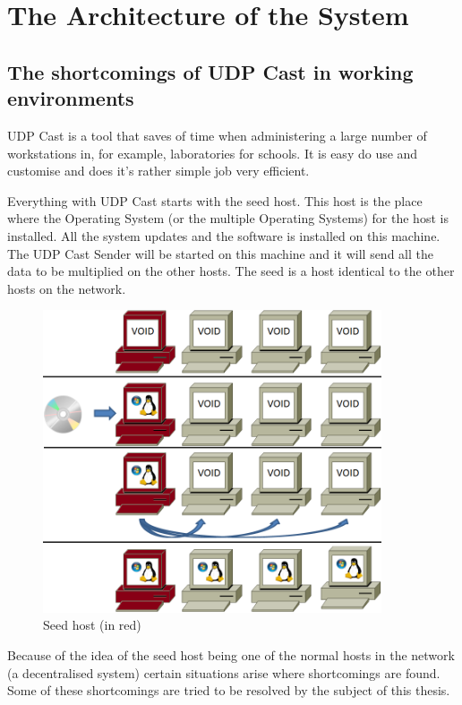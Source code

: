 

\chapter{The Architecture of the System}\label{ch:arch}
\bigskip


\section{The shortcomings of UDP Cast in working environments}

UDP Cast is a tool that saves of time when administering a
large number of workstations in, for example, laboratories for schools. It
is easy do use and customise and does it's rather simple job very
efficient.


Everything with UDP Cast starts with the seed host. This host is the place
where the Operating System (or the multiple Operating Systems) for the host
is installed. All the system updates and the software is installed on this
machine. The UDP Cast Sender will be started on this machine and it will
send all the data to be multiplied on the other hosts. The seed is a host
identical to the other hosts on the network.

\begin{figure}[h]
\includegraphics[width=10cm]{img/4comp_seed}
\caption{Seed host (in red)}
\label{fig:s4comp_seed}
\end{figure}

Because of the idea of the seed host being one of the normal hosts in the
network (a decentralised system) certain situations arise where
shortcomings are found. Some of these shortcomings are tried to be resolved
by the subject of this thesis.

